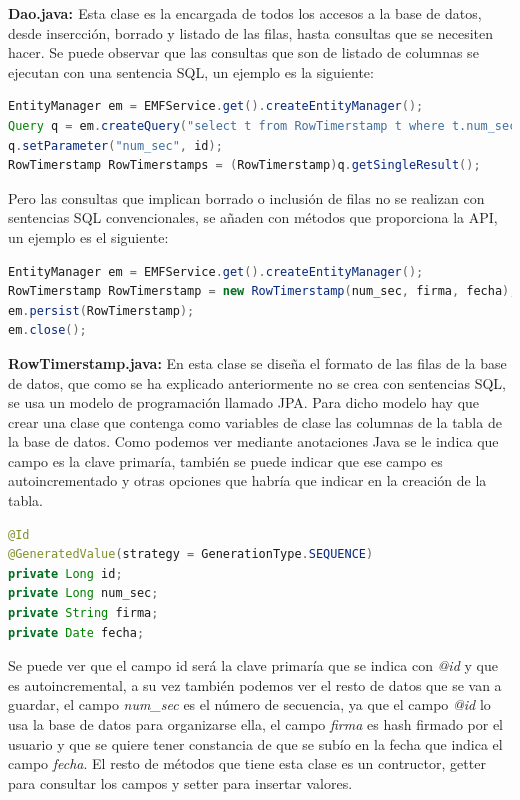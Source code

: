 \begin{description}
\item \textbf{Dao.java: \label{prueba}} Esta clase es la encargada de todos los accesos a la base de datos, desde insercción, borrado y listado de las filas, hasta consultas que se necesiten hacer. Se puede observar que las consultas que son de listado de columnas se ejecutan con una sentencia SQL, un ejemplo es la siguiente:
\begin{lstlisting}[language=Java]
EntityManager em = EMFService.get().createEntityManager();
Query q = em.createQuery("select t from RowTimerstamp t where t.num_sec = :num_sec");
q.setParameter("num_sec", id);
RowTimerstamp RowTimerstamps = (RowTimerstamp)q.getSingleResult();
\end{lstlisting}

Pero las consultas que implican borrado o inclusión de filas no se realizan con sentencias SQL convencionales, se añaden con métodos que proporciona la API, un ejemplo es el siguiente:
\begin{lstlisting}[language=Java]
EntityManager em = EMFService.get().createEntityManager();
RowTimerstamp RowTimerstamp = new RowTimerstamp(num_sec, firma, fecha);
em.persist(RowTimerstamp);
em.close();
\end{lstlisting}

\item \textbf{RowTimerstamp.java:} En esta clase se diseña el formato de las filas de la base de datos, que como se ha explicado anteriormente no se crea con sentencias SQL, se usa un modelo de programación llamado JPA. Para dicho modelo hay que crear una clase que contenga como variables de clase las columnas de la tabla de la base de datos. Como podemos ver mediante anotaciones Java se le indica que campo es la clave primaría, también se puede indicar que ese campo es autoincrementado y otras opciones que habría que indicar en la creación de la tabla.   

\begin{lstlisting}[language=Java]
@Id
@GeneratedValue(strategy = GenerationType.SEQUENCE)
private Long id;
private Long num_sec;
private String firma;
private Date fecha;
\end{lstlisting}

Se puede ver que el campo id será la clave primaría que se indica con \textit{@id} y que es autoincremental, a su vez también podemos ver el resto de datos que se van a guardar, el campo \textit{num\_sec} es el número de secuencia, ya que el campo \textit{@id} lo usa la base de datos para organizarse ella, el campo \textit{firma} es hash firmado por el usuario y que se quiere tener constancia de que se subío en la fecha que indica el campo \textit{fecha}.
El resto de métodos que tiene esta clase es un contructor, getter para consultar los campos y setter para insertar valores.


\end{description}
